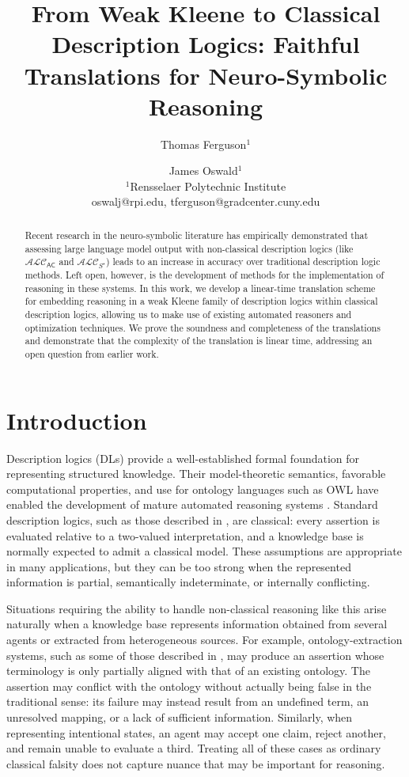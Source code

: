 \documentclass[letterpaper]{article}
\title{From Weak Kleene to Classical Description Logics: Faithful Translations for Neuro-Symbolic Reasoning}
\author{%
Thomas Ferguson$^1$\and
James Oswald$^1$ \\
\affiliations
$^1$Rensselaer Polytechnic Institute \\
\emails
oswalj@rpi.edu, 
tferguson@gradcenter.cuny.edu
}
\begin{document}
\maketitle

\begin{abstract}

Recent research in the neuro-symbolic literature has empirically demonstrated that assessing large language model output with non-classical description logics (like $\mathcal{ALC}_\mathsf{AC}$ and $\mathcal{ALC}_{S^\star}$) leads to an increase in accuracy over traditional description logic methods. Left open, however, is the development of methods for the implementation of reasoning in these systems. In this work, we develop a linear-time translation scheme for embedding reasoning in a weak Kleene family of description logics within classical description logics, allowing us to make use of existing automated reasoners and optimization techniques. We prove the soundness and completeness of the translations and demonstrate that the complexity of the translation is linear time, addressing an open question from earlier work.

\end{abstract}

\section{Introduction}

Description logics (DLs) provide a well-established formal foundation for representing structured knowledge. Their model-theoretic semantics, favorable computational properties, and use for ontology languages such as OWL have enabled the development of mature automated reasoning systems \cite{DBLP:conf/ore/MatentzogluLHSP15,DBLP:series/faia/SinghBM23}. Standard description logics, such as those described in \cite{DBLP:conf/dlog/2003handbook}, are classical: every assertion is evaluated relative to a two-valued interpretation, and a knowledge base is normally expected to admit a classical model. These assumptions are appropriate in many applications, but they can be too strong when the represented information is partial, semantically indeterminate, or internally conflicting.

Situations requiring the ability to handle non-classical reasoning like this arise naturally when a knowledge base represents information obtained from several agents or extracted from heterogeneous sources. For example, ontology-extraction systems, such as some of those described in \cite{DBLP:journals/csr/ArmaryVLN25}, may produce an assertion whose terminology is only partially aligned with that of an existing ontology. The assertion may conflict with the ontology without actually being false in the traditional sense: its failure may instead result from an undefined term, an unresolved mapping, or a lack of sufficient information. Similarly, when representing intentional states, an agent may accept one claim, reject another, and remain unable to evaluate a third. Treating all of these cases as ordinary classical falsity does not capture nuance that may be important for reasoning.
\end{document}
